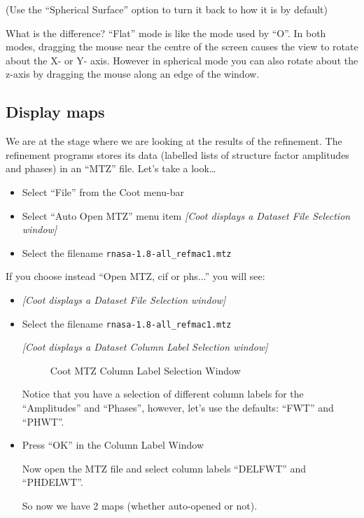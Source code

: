 \documentclass{article}
\begin{document}
(Use the \textsf{``Spherical Surface''} option to turn it back to how
it is by default)


What is the difference? ``Flat'' mode is like the mode used by ``O''.
In both modes, dragging the mouse near the centre of the screen causes
the view to rotate about the X- or Y- axis. However in spherical mode
you can also rotate about the z-axis by dragging the mouse along an
edge of the window.

\subsection{Display maps}

We are at the stage where we are looking at the results of the
refinement.  The refinement programs stores its data (labelled lists
of structure factor amplitudes and phases) in an ``MTZ'' file.  Let's
take a look\ldots


\begin{itemize}
\item Select \textsf{``File''} from the Coot menu-bar
\item Select \textsf{``Auto Open MTZ''} menu item
\textsl{  [Coot displays a Dataset File Selection window]}
\item Select the filename \texttt{rnasa-1.8-all\_refmac1.mtz}
\end{itemize}

If you choose instead ``Open MTZ, cif or phs...'' you will see:
\begin{itemize}

\item
\textsl{  [Coot displays a Dataset File Selection window]}

\item Select the filename \texttt{rnasa-1.8-all\_refmac1.mtz}

\textsl{  [Coot displays a Dataset Column Label Selection window]}


\begin{figure}[htbp]
  \begin{center}
    \leavevmode
    \epsfxsize 30mm
    \caption{Coot MTZ Column Label Selection Window}
    \label{fig:mtz_columns}
  \end{center}
\end{figure}

Notice that you have a selection of different column labels for the
``Amplitudes'' and ``Phases'', however, let's use the defaults:
``FWT'' and ``PHWT''.

\item Press \textsf{``OK''} in the Column Label Window

Now open the MTZ file and select column labels ``DELFWT'' and ``PHDELWT''.

So now we have 2 maps (whether auto-opened or not).
\end{itemize}
\end{document}
